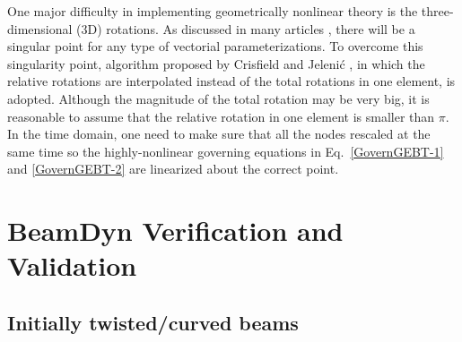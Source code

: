 \documentclass{aiaa-tc}
\begin{document}
One major difficulty in implementing geometrically nonlinear theory is the three-dimensional (3D) rotations. As discussed in many articles \cite{Crisfield:1999,Bauchau:2010,Bottasso:1998}, there will be a singular point for any type of vectorial parameterizations. To overcome this singularity point, algorithm proposed by Crisfield and Jeleni\'c \cite{Crisfield:1999}, in which the relative rotations are interpolated instead of the total rotations in one element, is adopted. Although the magnitude of the total rotation may be very big, it is reasonable to assume that the relative rotation in one element is smaller than $\pi$. In the time domain, one need to make sure that all the nodes rescaled at the same time so the highly-nonlinear governing equations in Eq.~\eqref{GovernGEBT-1} and \eqref{GovernGEBT-2} are linearized about the correct point.


\section{BeamDyn Verification and Validation}

\subsection{Initially twisted/curved beams}
\end{document}
